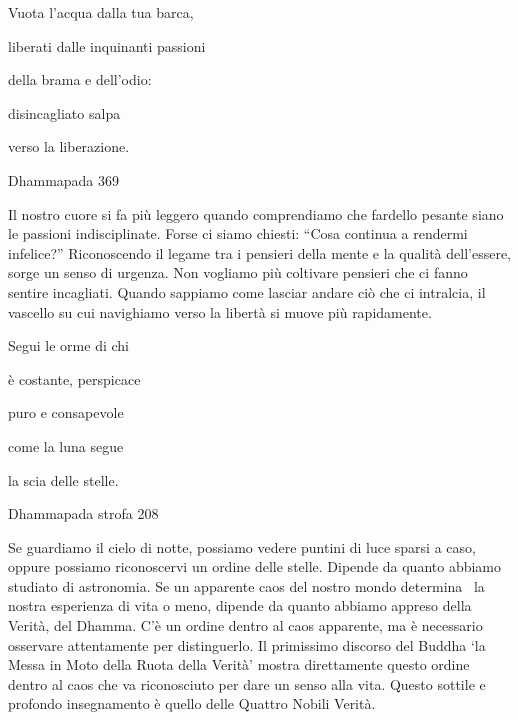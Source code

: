 \documentclass[a4paper,portrait,12pt]{article}
\begin{document}
\newpage



Vuota l'acqua dalla tua barca,


liberati dalle inquinanti passioni


della brama e dell'odio:


disincagliato salpa


verso la liberazione.





Dhammapada 369


\newpage



Il nostro cuore si fa più leggero quando comprendiamo che fardello pesante siano le passioni indisciplinate. Forse ci siamo chiesti: ``Cosa continua a rendermi infelice?'' Riconoscendo il legame tra i pensieri della mente e la qualit\`{a} dell'essere, sorge un senso di urgenza. Non vogliamo più coltivare pensieri che ci fanno sentire incagliati. Quando sappiamo come lasciar andare ci\`{o} che ci intralcia, il vascello su cui navighiamo verso la libert\`{a} si muove più rapidamente.


\newpage



Segui le orme di chi


\`{e} costante, perspicace


puro e consapevole


come la luna segue


la scia delle stelle.





Dhammapada strofa 208


\newpage



Se guardiamo il cielo di notte, possiamo vedere puntini di luce sparsi a caso, oppure possiamo riconoscervi un ordine delle stelle. Dipende da quanto abbiamo studiato di astronomia. Se un apparente caos del nostro mondo determina  la nostra esperienza di vita o meno, dipende da quanto abbiamo appreso della Verit\`{a}, del Dhamma. C'\`{e} un ordine dentro al caos apparente, ma \`{e} necessario osservare attentamente per distinguerlo. Il primissimo discorso del Buddha `la Messa in Moto della Ruota della Verit\`{a}' mostra direttamente questo ordine dentro al caos che va riconosciuto per dare un senso alla vita. Questo sottile e profondo insegnamento \`{e} quello delle Quattro Nobili Verit\`{a}.


\newpage
\end{document}
